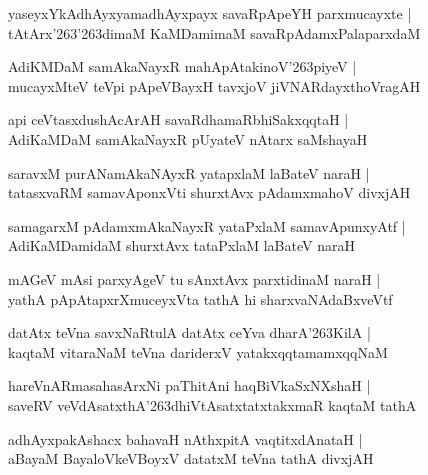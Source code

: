 \documentclass[twoside,12pt,openright]{book}
\def\S{\char'263}
\newcounter{shloka}[chapter]
\begin{document}
\begin{shloka}
yaseyxYkAdhAyxyamadhAyxpayx savaRpApeYH parxmucayxte |\\
tAtArx\S\S dimaM KaMDamimaM savaRpAdamxPalaparxdaM 
\end{shloka}

\begin{shloka}
AdiKMDaM samAkaNayxR mahApAtakinoV\S piyeV |\\
mucayxMteV teVpi pApeVBayxH tavxjoV jiVNARdayxthoVragAH 
\end{shloka}

\begin{shloka}
api ceVtasxdushAcArAH savaRdhamaRbhiSakxqqtaH |\\
AdiKaMDaM samAkaNayxR pUyateV nAtarx saMshayaH 
\end{shloka}

\begin{shloka}
saravxM purANamAkaNAyxR yatapxlaM laBateV naraH |\\
tatasxvaRM samavAponxVti shurxtAvx pAdamxmahoV divxjAH
\end{shloka}

\begin{shloka}
samagarxM pAdamxmAkaNayxR yataPxlaM samavApunxyAtf |\\
AdiKaMDamidaM shurxtAvx tataPxlaM laBateV naraH 
\end{shloka}

\begin{shloka}
mAGeV mAsi parxyAgeV tu sAnxtAvx parxtidinaM naraH |\\
yathA pApAtapxrXmuceyxVta tathA hi sharxvaNAdaBxveVtf 
\end{shloka}

\begin{shloka}
datAtx teVna savxNaRtulA datAtx ceYva dharA\S KilA |\\
kaqtaM vitaraNaM teVna dariderxV yatakxqqtamamxqqNaM 
\end{shloka}

\begin{shloka}
hareVnARmasahasArxNi paThitAni haqBiVkaSxNXshaH |\\
saveRV veVdAsatxthA\S dhiVtAsatxtatxtakxmaR kaqtaM tathA 
\end{shloka}

\begin{shloka}
adhAyxpakAshacx bahavaH nAthxpitA vaqtitxdAnataH |\\
aBayaM BayaloVkeVBoyxV datatxM teVna tathA divxjAH 
\end{shloka}
\end{document}
